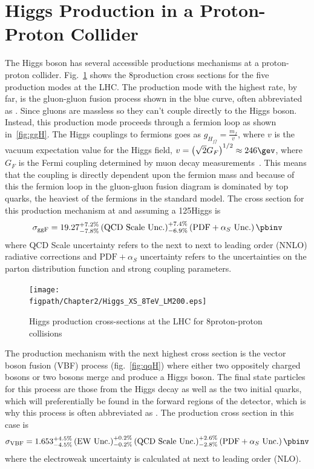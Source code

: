 \section{Higgs Production in a Proton-Proton Collider}
\label{sec:higgs_production}

The Higgs boson has several accessible productions mechanisms at a proton-proton collider.
Fig.~\ref{fig:HiggsProductionCrossSections} shows the 8\tev production cross sections for the five production modes at the LHC.
The production mode with the highest rate, by far, is the gluon-gluon fusion process shown in the blue curve, often abbreviated as \ggH.
Since gluons are massless so they can't couple directly to the Higgs boson.
Instead, this production mode proceeds through a fermion loop as shown in~\ref{fig:ggH}.
The Higgs couplings to fermions goes as $g_{H_{f\bar{f}}}=\frac{m_{f}}{v}$, where $v$ is the vacuum expectation value for the Higgs field, $v=\left(\sqrt{2}G_{F}\right)^{1/2}\approx\text{246}\gev$, where $G_{F}$ is the Fermi coupling determined by muon decay measurements~\cite{PDG}.
This means that the coupling is directly dependent upon the fermion mass and because of this the fermion loop in the gluon-gluon fusion diagram is dominated by top quarks, the heaviest of the fermions in the standard model.
The cross section for this production mechanism at \tev and assuming a 125\gev Higgs is
\begin{equation}
	\sigma_{\text{ggF}}=\text{19.27}_{-\text{7.8\%}}^{+\text{7.2\%}}\left(\text{QCD Scale Unc.}\right)_{-\text{6.9\%}}^{+\text{7.4\%}}\left(\text{PDF}+\alpha_{S}\text{ Unc.}\right)\pbinv
\end{equation}
where QCD Scale uncertainty refers to the next to next to leading order (NNLO) radiative corrections and $\text{PDF}+\alpha_{S}$ uncertainty refers to the uncertainties on the parton distribution function and strong coupling parameters.

\begin{figure}[!hbt]
  \centering
  \texttt{[image: \\figpath/Chapter2/Higgs\_XS\_8TeV\_LM200.eps]}
  \caption{Higgs production cross-sections at the LHC for 8\TeV proton-proton collisions}
  \label{fig:HiggsProductionCrossSections}
\end{figure}

The production mechanism with the next highest cross section is the vector boson fusion (VBF) process (fig.~\ref{fig:qqH}) where either two oppositely charged \W bosons or two \Z bosons merge and produce a Higgs boson.
The final state particles for this process are those from the Higgs decay as well as the two initial quarks, which will preferentially be found in the forward regions of the detector, which is why this process is often abbreviated as \qqH.
The production cross section in this case is
\begin{equation}
	\sigma_{\text{VBF}}=\text{1.653}_{-\text{4.5\%}}^{+\text{4.5\%}}\left(\text{EW Unc.}\right)_{-\text{0.2\%}}^{+\text{0.2\%}}\left(\text{QCD Scale Unc.}\right)_{-\text{2.8\%}}^{+\text{2.6\%}}\left(\text{PDF}+\alpha_{S}\text{ Unc.}\right)\pbinv
\end{equation}
where the electroweak uncertainty is calculated at next to leading order (NLO).

